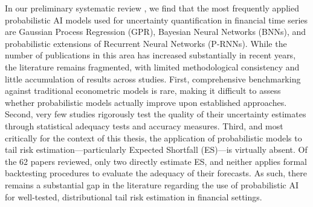 




In our preliminary systematic review \parencite{eggen2025probabilistic}, we find that the most frequently applied probabilistic AI models used for uncertainty quantification in financial time series are Gaussian Process Regression (GPR), Bayesian Neural Networks (BNNs), and probabilistic extensions of Recurrent Neural Networks (P-RNNs). While the number of publications in this area has increased substantially in recent years, the literature remains fragmented, with limited methodological consistency and little accumulation of results across studies. First, comprehensive benchmarking against traditional econometric models is rare, making it difficult to assess whether probabilistic models actually improve upon established approaches. Second, very few studies rigorously test the quality of their uncertainty estimates through statistical adequacy tests and accuracy measures. Third, and most critically for the context of this thesis, the application of probabilistic models to tail risk estimation—particularly Expected Shortfall (ES)—is virtually absent. Of the 62 papers reviewed, only two directly estimate ES, and neither applies formal backtesting procedures to evaluate the adequacy of their forecasts. As such, there remains a substantial gap in the literature regarding the use of probabilistic AI for well-tested, distributional tail risk estimation in financial settings.




